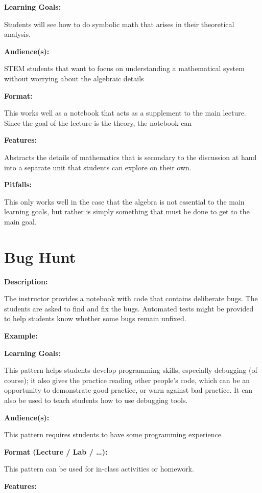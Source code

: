 \documentclass[]{book}
\begin{document}
\textbf{Learning Goals:}

Students will see how to do symbolic math that arises in their
theoretical analysis.

\textbf{Audience(s):}

STEM students that want to focus on understanding a mathematical system
without worrying about the algebraic details

\textbf{Format:}

This works well as a notebook that acts as a supplement to the main
lecture. Since the goal of the lecture is the theory, the notebook can

\textbf{Features:}

Abstracts the details of mathematics that is secondary to the discussion
at hand into a separate unit that students can explore on their own.

\textbf{Pitfalls:}

This only works well in the case that the algebra is not essential to
the main learning goals, but rather is simply something that must be
done to get to the main goal.

\section{Bug Hunt}\label{bug-hunt}

\textbf{Description:}

The instructor provides a notebook with code that contains deliberate
bugs. The students are asked to find and fix the bugs. Automated tests
might be provided to help students know whether some bugs remain
unfixed.

\textbf{Example:}

\textbf{Learning Goals:}

This pattern helps students develop programming skills, especially
debugging (of course); it also gives the practice reading other people's
code, which can be an opportunity to demonstrate good practice, or warn
against bad practice. It can also be used to teach students how to use
debugging tools.

\textbf{Audience(s):}

This pattern requires students to have some programming experience.

\textbf{Format (Lecture / Lab / \ldots{}):}

This pattern can be used for in-class activities or homework.

\textbf{Features:}
\end{document}
